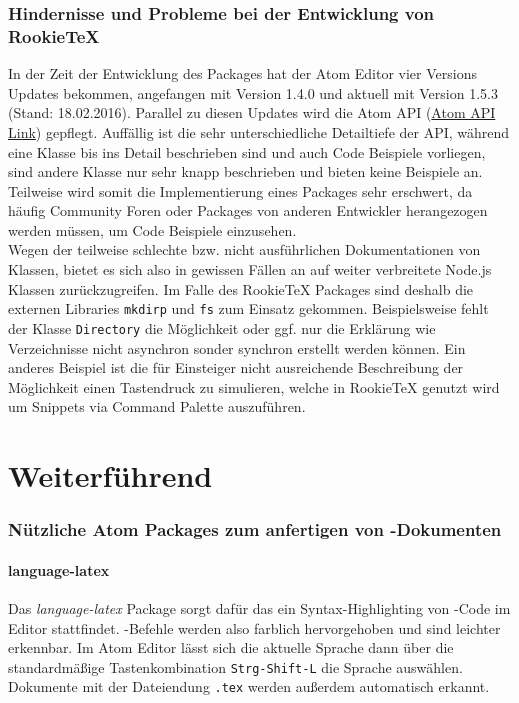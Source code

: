     \section{Hindernisse und Probleme bei der Entwicklung von RookieTeX}
        In der Zeit der Entwicklung des Packages hat der Atom Editor vier Versions Updates bekommen, angefangen mit Version 1.4.0 und aktuell mit Version 1.5.3 (Stand: 18.02.2016). Parallel zu diesen Updates wird die Atom API (\href{https://www.atom.io/docs/api/}{Atom API Link}) gepflegt. Auffällig ist die sehr unterschiedliche Detailtiefe der API, während eine Klasse bis ins Detail beschrieben sind und auch Code Beispiele vorliegen, sind andere Klasse nur sehr knapp beschrieben und bieten keine Beispiele an. Teilweise wird somit die Implementierung eines Packages sehr erschwert, da häufig Community Foren oder Packages von anderen Entwickler herangezogen werden müssen, um Code Beispiele einzusehen.
        \\
        Wegen der teilweise schlechte bzw. nicht ausführlichen Dokumentationen von Klassen, bietet es sich also in gewissen Fällen an auf weiter verbreitete Node.js Klassen zurückzugreifen. Im Falle des RookieTeX Packages sind deshalb die externen Libraries \texttt{mkdirp} und \texttt{fs} zum Einsatz gekommen. Beispielsweise fehlt der Klasse \texttt{Directory} die Möglichkeit oder ggf. nur die Erklärung wie Verzeichnisse nicht asynchron sonder synchron erstellt werden können. Ein anderes Beispiel ist die für Einsteiger nicht ausreichende Beschreibung der Möglichkeit einen Tastendruck zu simulieren, welche in RookieTeX genutzt wird um Snippets via Command Palette auszuführen.

\part{Weiterführend}
    \section{Nützliche Atom Packages zum anfertigen von \latex-Dokumenten}
        \subsection{language-latex}
            Das \textit{language-latex} Package sorgt dafür das ein Syntax-Highlighting von \latex-Code im Editor stattfindet. \latex-Befehle werden also farblich hervorgehoben und sind leichter erkennbar. Im Atom Editor lässt sich die aktuelle Sprache dann über die standardmäßige Tastenkombination \texttt{Strg-Shift-L} die Sprache \latex auswählen. Dokumente mit der Dateiendung \texttt{.tex} werden außerdem automatisch erkannt.
